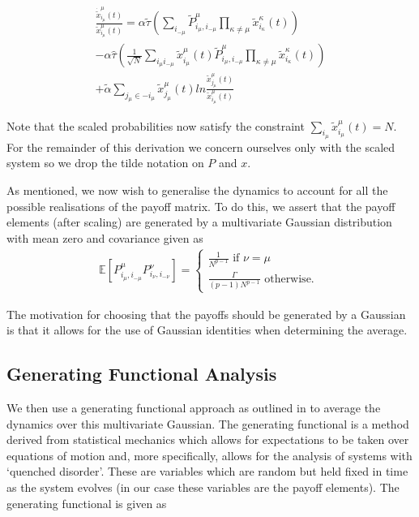 \documentclass[sigconf]{aamas}
\newcommand{\payoff}[2]{P^{#2}_{#1_#2, #1_{-#2}}}
\newcommand{\txmu}[2]{\tilde{x}_{#1_#2}^{#2}(t)}
\newcommand{\dtxmu}[2]{\dot{\tilde{x}}_{#1_#2}^{#2}(t)}
\newcommand{\tpayoff}[2]{\tilde{P}^{#2}_{#1_#2, #1_{-#2}}}
\newcommand{\talpha}{\tilde{\alpha}}
\newcommand{\ttau}{\tilde{\tau}}
\newcommand{\htau}{\hat{\tau}}
\begin{document}
\begin{equation}
\begin{split}
    \label{eqn::scaledEOM}
    \frac{\dtxmu{i}{\mu}}{\txmu{i}{\mu}} = \alpha \ttau \left ( \sum_{i_{-\mu}} \tpayoff{i}{\mu} \prod_{\kappa \neq \mu} \txmu{i}{\kappa} \right ) \\ - \alpha \htau \left ( \frac{1}{\sqrt{N}} \sum_{i_\mu i_{-\mu}} \txmu{i}{\mu} \tpayoff{i}{\mu} \prod_{\kappa \neq \mu} \txmu{i}{\kappa} \right ) \\ + \talpha \sum_{j_\mu \in -i_\mu} \txmu{j}{\mu} ln \frac{\txmu{j}{\mu}}{\txmu{i}{\mu}}
\end{split}
\end{equation}

Note that the scaled probabilities now satisfy the constraint $\sum_{i_\mu} \txmu{i}{\mu} = N$. For the remainder of this derivation we concern ourselves only with the scaled system so we drop the tilde notation on $P$ and $x$. 

As mentioned, we now wish to generalise the dynamics to account for all the possible realisations of the payoff matrix. To do this, we assert that the payoff elements (after scaling) are generated by a multivariate Gaussian distribution with mean zero and covariance given as
%
\begin{equation}
\label{eqn::Payoffs}
    \begin{split}
        \mathbb{E}\left [ \payoff{i}{\mu} \payoff{i}{\nu} \right] = \begin{cases}
        \frac{1}{N^{p-1}}  \text{ if } \nu = \mu \\
        \frac{\Gamma}{(p-1) N^{p-1}} \text{ otherwise. }
        \end{cases}
    \end{split}
\end{equation}

The motivation for choosing that the payoffs should be generated by a Gaussian is that it allows for the use of Gaussian identities when determining the average.

\subsection{Generating Functional Analysis}

We then use a generating functional approach as outlined in \cite{Mezard1986} to average the dynamics over this multivariate Gaussian. The generating functional is a method derived from statistical mechanics which allows for expectations to be taken over equations of motion and, more specifically, allows for the analysis of systems with `quenched disorder'. These are variables which are random but held fixed in time as the system evolves (in our case these variables are the payoff elements). The generating functional is given as \cite{SpinGlassTheory}
\end{document}
